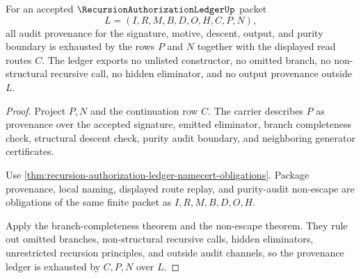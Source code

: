 \begin{theorem}
\label{thm:recursion-authorization-ledger-audit-provenance-exhaustion}
For an accepted $\RecursionAuthorizationLedgerUp$ packet
$$
L=(I,R,M,B,D,O,H,C,P,N),
$$
all audit provenance for the signature, motive, descent, output, and purity boundary is exhausted by the rows $P$ and $N$ together with the displayed read routes $C$. The ledger exports no unlisted constructor, no omitted branch, no non-structural recursive call, no hidden eliminator, and no output provenance outside $L$.
\end{theorem}
\begin{proof}
Project $P,N$ and the continuation row $C$. The carrier describes $P$ as provenance over the accepted signature, emitted eliminator, branch completeness check, structural descent check, purity audit boundary, and neighboring generator certificates.

Use \autoref{thm:recursion-authorization-ledger-namecert-obligations}. Package provenance, local naming, displayed route replay, and purity-audit non-escape are obligations of the same finite packet as $I,R,M,B,D,O,H$.

Apply the branch-completeness theorem and the non-escape theorem. They rule out omitted branches, non-structural recursive calls, hidden eliminators, unrestricted recursion principles, and outside audit channels, so the provenance ledger is exhausted by $C,P,N$ over $L$.
\end{proof}

